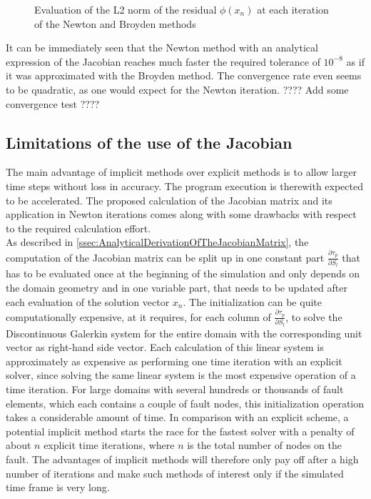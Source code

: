 \documentclass{report}
\begin{document}
\begin{figure}[H]
\begin{subfigure}{0.32\textwidth}
 	\end{subfigure}
 	\caption{Evaluation of the L2 norm of the residual $\phi(x_n)$ at each iteration of the Newton and Broyden methods}
 	\label{fig:convergenceNewtonAndBroyden}
 \end{figure}
 It can be immediately seen that the Newton method with an analytical expression of the Jacobian reaches much faster the required tolerance of $10^{-8}$ as if it was approximated with the Broyden method. The convergence rate even seems to be quadratic, as one would expect for the Newton iteration. ???? Add some convergence test ????


\subsection{Limitations of the use of the Jacobian}
The main advantage of implicit methods over explicit methods is to allow larger time steps without loss in accuracy. The program execution is therewith expected to be accelerated. The proposed calculation of the Jacobian matrix and its application in Newton iterations comes along with some drawbacks with respect to the required calculation effort. \\
As described in \autoref{ssec:AnalyticalDerivationOfTheJacobianMatrix}, the computation of the Jacobian matrix can be split up in one constant part $\frac{\partial \tau_p}{\partial S_l}$ that has to be evaluated once at the beginning of the simulation and only depends on the domain geometry and in one variable part, that needs to be updated after each evaluation of the solution vector $x_n$. The initialization can be quite computationally expensive, at it requires, for each column of $\frac{\partial \tau_p}{\partial S_l}$, to solve the Discontinuous Galerkin system for the entire domain with the corresponding unit vector as right-hand side vector. Each calculation of this linear system is approximately as expensive as performing one time iteration with an explicit solver, since solving the same linear system is the most expensive operation of a time iteration. For large domains with several hundreds or thousands of fault elements, which each contains a couple of fault nodes, this initialization operation takes a considerable amount of time. In comparison with an explicit scheme, a potential implicit method starts the race for the fastest solver with a penalty of about $n$ explicit time iterations, where $n$ is the total number of nodes on the fault. The advantages of implicit methods will therefore only pay off after a high number of iterations and make such methods of interest only if the simulated time frame is very long. \\
\end{document}
